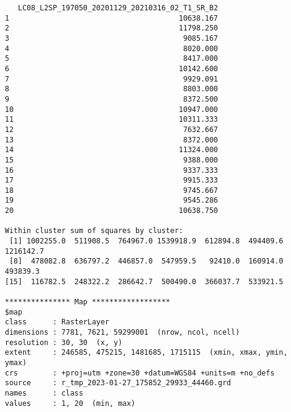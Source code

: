 \begin{scriptsize}
\begin{verbatim}
   LC08_L2SP_197050_20201129_20210316_02_T1_SR_B2
1                                       10638.167
2                                       11798.250
3                                        9085.167
4                                        8020.000
5                                        8417.000
6                                       10142.600
7                                        9929.091
8                                        8803.000
9                                        8372.500
10                                      10947.000
11                                      10311.333
12                                       7632.667
13                                       8372.000
14                                      11324.000
15                                       9388.000
16                                       9337.333
17                                       9915.333
18                                       9745.667
19                                       9545.286
20                                      10638.750

Within cluster sum of squares by cluster:
 [1] 1002255.0  511908.5  764967.0 1539918.9  612894.8  494409.6 1216142.7
 [8]  478082.8  636797.2  446857.0  547959.5   92410.0  160914.0  493839.3
[15]  116782.5  248322.2  286642.7  500490.0  366037.7  533921.5

*************** Map ******************
$map
class      : RasterLayer 
dimensions : 7781, 7621, 59299001  (nrow, ncol, ncell)
resolution : 30, 30  (x, y)
extent     : 246585, 475215, 1481685, 1715115  (xmin, xmax, ymin, ymax)
crs        : +proj=utm +zone=30 +datum=WGS84 +units=m +no_defs 
source     : r_tmp_2023-01-27_175852_29933_44460.grd 
names      : class 
values     : 1, 20  (min, max)
\end{verbatim}
\end{scriptsize}